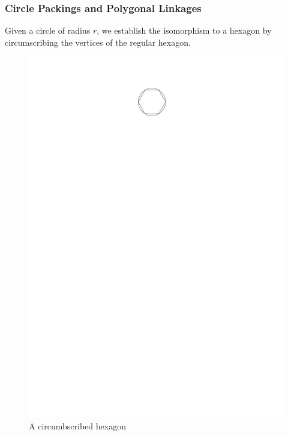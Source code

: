 \subsubsection{Circle Packings and Polygonal Linkages}
Given a circle of radius $r$, we establish the isomorphism to a hexagon by
circumscribing the vertices of the regular hexagon.
\begin{figure}[h]
\begin{center}
\includegraphics{graphics/circumscribedHexagon.pdf}
\caption{A circumbscribed hexagon}
\end{center}
\end{figure}
